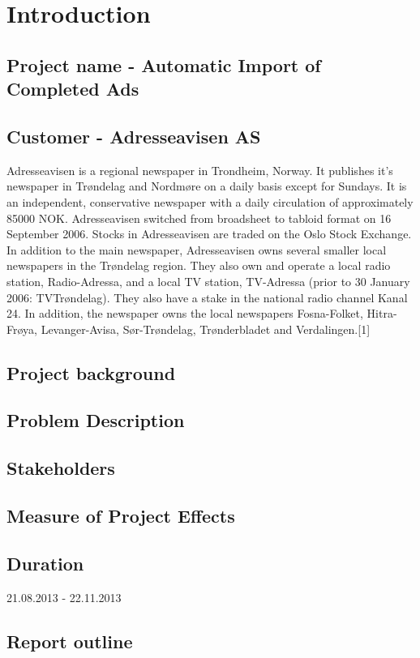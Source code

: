 \section{Introduction}
\subsection{Project name - Automatic Import of Completed Ads}
\subsection{Customer - Adresseavisen AS}
Adresseavisen is a regional newspaper in Trondheim, Norway. It publishes it's newspaper in Trøndelag and Nordmøre on a daily basis except for Sundays. It is an independent, conservative newspaper with a daily circulation of approximately 85000 NOK. 
Adresseavisen switched from broadsheet to tabloid format on 16 September 2006. Stocks in Adresseavisen are traded on the Oslo Stock Exchange.\\
In addition to the main newspaper, Adresseavisen owns several smaller local newspapers in the Trøndelag region. They also own and operate a local radio station, Radio-Adressa, and a local TV station, TV-Adressa (prior to 30 January 2006: TVTrøndelag). They also have a stake in the national radio channel Kanal 24. In addition, the newspaper owns the local newspapers Fosna-Folket, Hitra-Frøya, Levanger-Avisa, Sør-Trøndelag, Trønderbladet and Verdalingen.[1]


\subsection{Project background}
\subsection{Problem Description}
\subsection{Stakeholders}
\subsection{Measure of Project Effects}
\subsection{Duration}
21.08.2013 - 22.11.2013
\subsection{Report outline}